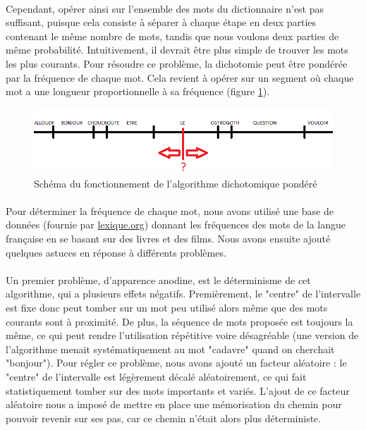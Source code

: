 \documentclass[11pt,a4paper]{article}
\theoremstyle{plain}
\theoremstyle{definition}
\begin{document}
\paragraph{} Cependant, opérer ainsi sur l'ensemble des mots du dictionnaire n'est pas suffisant, puisque cela consiste à séparer à chaque étape en deux parties contenant le même nombre de mots, tandis que nous voulons deux parties de même probabilité. Intuitivement, il devrait être plus simple de trouver les mots les plus courants. Pour résoudre ce problème, la dichotomie peut être pondérée par la fréquence de chaque mot. Cela revient à opérer sur un segment où chaque mot a une longueur proportionnelle à sa fréquence (figure \ref{algo}).

\begin{figure}[h!]
\centering
\includegraphics[width=16cm]{images/schema_algo.png}
\caption{Schéma du fonctionnement de l'algorithme dichotomique pondéré}
\label{algo}
\end{figure}

\paragraph{} Pour déterminer la fréquence de chaque mot, nous avons utilisé une base de données (fournie par \href{http://lexique.org}{lexique.org}) donnant les fréquences des mots de la langue française en se basant sur des livres et des films. Nous avons ensuite ajouté quelques astuces en réponse à différents problèmes.
\paragraph{} Un premier problème, d'apparence anodine, est le déterminisme de cet algorithme, qui a plusieurs effets négatifs. Premièrement, le "centre" de l'intervalle est fixe donc peut tomber sur un mot peu utilisé alors même que des mots courants sont à proximité. De plus, la séquence de mots proposée est toujours la même, ce qui peut rendre l'utilisation répétitive voire désagréable (une version de l'algorithme menait systématiquement au mot "cadavre" quand on cherchait "bonjour"). Pour régler ce problème, nous avons ajouté un facteur aléatoire : le "centre" de l'intervalle est légèrement décalé aléatoirement, ce qui fait statistiquement tomber sur des mots importants et variés. L'ajout de ce facteur aléatoire nous a imposé de mettre en place une mémorisation du chemin pour pouvoir revenir sur ses pas, car ce chemin n'était alors plus déterministe.
\end{document}
